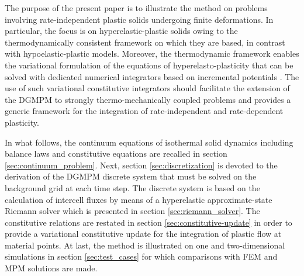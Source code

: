 The purpose of the present paper is to illustrate the method on problems involving rate-independent plastic solids undergoing finite deformations.
In particular, the focus is on hyperelastic-plastic solids owing to the thermodynamically consistent framework on which they are based, in contrast with hypoelastic-plastic models. 
Moreover, the thermodynamic framework enables the variational formulation of the equations of hyperelasto-plasticity that can be solved with dedicated numerical integrators based on incremental potentials \cite{Laurent99}.
The use of such variational constitutive integrators should facilitate the extension of the DGMPM to strongly thermo-mechanically coupled problems and provides a generic framework for the integration of rate-independent and rate-dependent plasticity.
   

In what follows, the continuum equations of isothermal solid dynamics including balance laws and constitutive equations are recalled in section \ref{sec:continuum_problem}.
Next, section \ref{sec:discretization} is devoted to the derivation of the DGMPM discrete system that must be solved on the background grid at each time step. 
The discrete system is based on the calculation of intercell fluxes by means of a hyperelastic approximate-state Riemann solver which is presented in section \ref{sec:riemann_solver}.
The constitutive relations are restated in section \ref{sec:constitutive-update} in order to provide a variational constitutive update for the integration of plastic flow at material points.
At last, the method is illustrated on one and two-dimensional simulations in section \ref{sec:test_cases} for which comparisons with FEM and MPM solutions are made.


